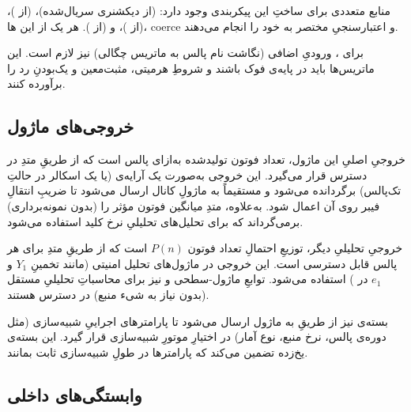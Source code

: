 منابع متعددی برای ساختِ این پیکربندی وجود دارد:  (از دیکشنری سریال‌شده)،  (از )،  (از )، و  (از ). هر یک از این ها، coerce و اعتبارسنجیِ مختصر به خود را انجام می‌دهند.

برای ، ورودیِ اضافی  (نگاشت نام پالس به ماتریس چگالی) نیز لازم است. این ماتریس‌ها باید در پایه‌ی فوک باشند و شروطِ هرمیتی، مثبت‌معین و یک‌بودنِ رد را برآورده کنند.

\subsection{خروجی‌های ماژول}

خروجیِ اصلیِ این ماژول، تعداد فوتون تولیدشده به‌ازای پالس است که از طریقِ متدِ  در دسترس قرار می‌گیرد. این خروجی به‌صورت یک آرایه‌ی  (یا یک اسکالر در حالتِ تک‌پالس) برگردانده می‌شود و مستقیماً به ماژولِ کانال  ارسال می‌شود تا ضریبِ انتقالِ فیبر روی آن اعمال شود. به‌علاوه، متدِ  میانگین فوتون مؤثر را (بدون نمونه‌برداری) برمی‌گرداند که برای تحلیل‌های تحلیلیِ نرخ کلید استفاده می‌شود.

خروجیِ تحلیلیِ دیگر، توزیعِ احتمالِ تعداد فوتون $P(n)$ است که از طریقِ متدِ  برای هر پالس قابل دسترسی است. این خروجی در ماژول‌های تحلیل امنیتی (مانند تخمینِ $Y_1$ و $e_1$ در ) استفاده می‌شود. توابعِ ماژول-سطحی  و  نیز برای محاسباتِ تحلیلیِ مستقل (بدون نیاز به شیء منبع) در دسترس هستند.

بسته‌ی  نیز از طریقِ  به ماژول  ارسال می‌شود تا پارامترهای اجراییِ شبیه‌سازی (مثل دوره‌ی پالس، نرخ منبع، نوع آمار) در اختیارِ موتورِ شبیه‌سازی قرار گیرد. این بسته‌ی یخ‌زده تضمین می‌کند که پارامترها در طولِ شبیه‌سازی ثابت بمانند.

\subsection{وابستگی‌های داخلی}

